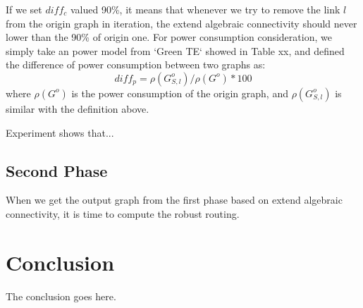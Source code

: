 \documentclass[conference]{IEEEtran}
\begin{document}
If we set $diff_c$ valued 90\%, it means that whenever we try to remove the link $l$ from the origin graph in 
iteration, the extend algebraic connectivity should never lower than the 90\% of origin one. For power consumption
consideration, we simply take an power model from `Green TE` showed in Table xx, and defined the difference of 
power consumption between two graphs as:
\begin{equation}
	diff_p = \rho(G_{S, l}^o) / \rho(G^o) * 100
\end{equation}
where $\rho(G^o)$ is the power consumption of the origin graph, and $\rho(G_{S, l}^o)$ is similar with the 
definition above.




Experiment shows that...


\subsection{Second Phase}
When we get the output graph from the first phase based on extend algebraic connectivity, it is time to compute
the robust routing.
 


\section{Conclusion}
The conclusion goes here.


\end{document}

